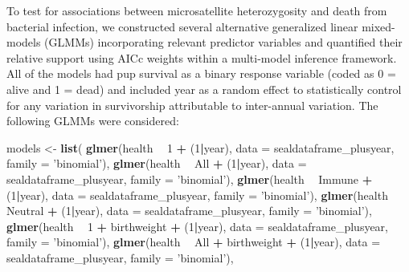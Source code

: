 \documentclass[]{article}
\newenvironment{Shaded}{\begin{snugshade}}{\end{snugshade}}
\newcommand{\KeywordTok}[1]{\textcolor[rgb]{0.13,0.29,0.53}{\textbf{#1}}}
\newcommand{\DataTypeTok}[1]{\textcolor[rgb]{0.13,0.29,0.53}{#1}}
\newcommand{\DecValTok}[1]{\textcolor[rgb]{0.00,0.00,0.81}{#1}}
\newcommand{\StringTok}[1]{\textcolor[rgb]{0.31,0.60,0.02}{#1}}
\newcommand{\OperatorTok}[1]{\textcolor[rgb]{0.81,0.36,0.00}{\textbf{#1}}}
\newcommand{\NormalTok}[1]{#1}
\begin{document}
To test for associations between microsatellite heterozygosity and death
from bacterial infection, we constructed several alternative generalized
linear mixed-models (GLMMs) incorporating relevant predictor variables
and quantified their relative support using AICc weights within a
multi-model inference framework. All of the models had pup survival as a
binary response variable (coded as 0 = alive and 1 = dead) and included
year as a random effect to statistically control for any variation in
survivorship attributable to inter-annual variation. The following GLMMs
were considered:

\begin{Shaded}
\begin{Highlighting}[]
\NormalTok{models <-}\StringTok{ }\KeywordTok{list}\NormalTok{(}
  \KeywordTok{glmer}\NormalTok{(health }\OperatorTok{~}\StringTok{  }\DecValTok{1} \OperatorTok{+}\StringTok{ }\NormalTok{(}\DecValTok{1}\OperatorTok{|}\NormalTok{year), }\DataTypeTok{data =}\NormalTok{ sealdataframe_plusyear, }\DataTypeTok{family =} \StringTok{'binomial'}\NormalTok{),}
  \KeywordTok{glmer}\NormalTok{(health }\OperatorTok{~}\StringTok{  }\NormalTok{All }\OperatorTok{+}\StringTok{ }\NormalTok{(}\DecValTok{1}\OperatorTok{|}\NormalTok{year), }\DataTypeTok{data =}\NormalTok{ sealdataframe_plusyear, }\DataTypeTok{family =} \StringTok{'binomial'}\NormalTok{),}
  \KeywordTok{glmer}\NormalTok{(health }\OperatorTok{~}\StringTok{  }\NormalTok{Immune }\OperatorTok{+}\StringTok{ }\NormalTok{(}\DecValTok{1}\OperatorTok{|}\NormalTok{year), }\DataTypeTok{data =}\NormalTok{ sealdataframe_plusyear, }\DataTypeTok{family =} \StringTok{'binomial'}\NormalTok{),}
  \KeywordTok{glmer}\NormalTok{(health }\OperatorTok{~}\StringTok{  }\NormalTok{Neutral }\OperatorTok{+}\StringTok{ }\NormalTok{(}\DecValTok{1}\OperatorTok{|}\NormalTok{year), }\DataTypeTok{data =}\NormalTok{ sealdataframe_plusyear, }\DataTypeTok{family =} \StringTok{'binomial'}\NormalTok{), }
  \KeywordTok{glmer}\NormalTok{(health }\OperatorTok{~}\StringTok{  }\DecValTok{1} \OperatorTok{+}\StringTok{ }\NormalTok{birthweight }\OperatorTok{+}\StringTok{ }\NormalTok{(}\DecValTok{1}\OperatorTok{|}\NormalTok{year), }\DataTypeTok{data =}\NormalTok{ sealdataframe_plusyear, }\DataTypeTok{family =} \StringTok{'binomial'}\NormalTok{),}
  \KeywordTok{glmer}\NormalTok{(health }\OperatorTok{~}\StringTok{  }\NormalTok{All }\OperatorTok{+}\StringTok{ }\NormalTok{birthweight }\OperatorTok{+}\StringTok{ }\NormalTok{(}\DecValTok{1}\OperatorTok{|}\NormalTok{year), }\DataTypeTok{data =}\NormalTok{ sealdataframe_plusyear, }\DataTypeTok{family =} \StringTok{'binomial'}\NormalTok{),}

\end{Highlighting}
\end{Shaded}
\end{document}
